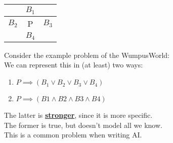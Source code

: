 \documentclass[../../lecture_notes.tex]{subfiles}
\begin{document}
\begin{center} \begin{minipage}{0.2\textwidth}
\begin{tabular}{ | c | c | c | }
	\hline
	& $B_1$ & \\
	\hline
	$B_2$ & P & $B_3$ \\
	\hline
	& $B_4$ & \\
	\hline
\end{tabular} 
\end{minipage}%
\begin{minipage}{0.8\textwidth}
\noindent Consider the example problem of the WumpusWorld:\\
\noindent We can represent this in (at least) two ways:
\begin{enumerate} [itemsep=0mm]
	\item $P \implies (B_1 \lor B_2 \lor B_3\lor B_4)$
	\item $P \implies (B1 \land B2 \land B3 \land B4)$
\end{enumerate}
\noindent The latter is \textbf{\underline{stronger}}, since it is more specific.\\
The former is true, but doesn’t model all we know.\\
This is a common problem when writing AI.
\end{minipage} \end{center}
\end{document}
